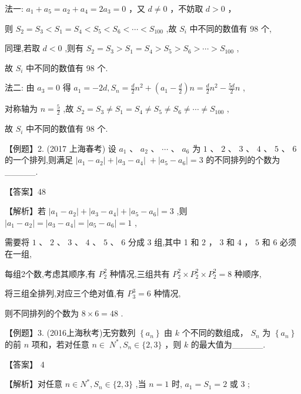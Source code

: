 \documentclass[10pt]{article}
\begin{document}
法一: \({a}_{1} + {a}_{5} = {a}_{2} + {a}_{4} = 2{a}_{3} = 0\) ，又 \(d \neq  0\) ，不妨取 \(d > 0\) ，

则 \({S}_{2} = {S}_{3} < {S}_{1} = {S}_{4} < {S}_{5} < {S}_{6} < \cdots  < {S}_{100}\) ,故 \({S}_{i}\) 中不同的数值有 98 个,

同理,若取 \(d < 0\) ,则有 \({S}_{2} = {S}_{3} > {S}_{1} = {S}_{4} > {S}_{5} > {S}_{6} > \cdots  > {S}_{100}\) ,

故 \({S}_{i}\) 中不同的数值有 98 个.

法二: 由 \({a}_{3} = 0\) 得 \({a}_{1} =  - {2d},{S}_{n} = \frac{d}{2}{n}^{2} + \left( {{a}_{1} - \frac{d}{2}}\right) n = \frac{d}{2}{n}^{2} - \frac{5d}{2}n\) ,

对称轴为 \(n = \frac{5}{2}\) ,故 \({S}_{2} = {S}_{3} \neq  {S}_{1} = {S}_{4} \neq  {S}_{5} \neq  {S}_{6} \neq  \cdots  \neq  {S}_{100}\) ,

故 \({S}_{i}\) 中不同的数值有 98 个.

【例题】2. (2017 上海春考) 设 \({a}_{1}\text{ 、 }{a}_{2}\text{ 、 }\cdots \text{ 、 }{a}_{6}\) 为 \(1\text{ 、 }2\text{ 、 }3\text{ 、 }4\text{ 、 }5\text{ 、 }6\) 的一个排列,则满足 \(\left| {{a}_{1} - {a}_{2}}\right|  + \left| {{a}_{3} - {a}_{4}}\right| \; + \left| {{a}_{5} - {a}_{6}}\right|  = 3\) 的不同排列的个数为\_\_\_\_\_.

【答案】48

【解析】若 \(\left| {{a}_{1} - {a}_{2}}\right|  + \left| {{a}_{3} - {a}_{4}}\right|  + \left| {{a}_{5} - {a}_{6}}\right|  = 3\) ,则 \(\left| {{a}_{1} - {a}_{2}}\right|  = \left| {{a}_{3} - {a}_{4}}\right|  = \left| {{a}_{5} - {a}_{6}}\right|  = 1\) ,

需要将 \(1\text{ 、 }2\text{ 、 }3\text{ 、 }4\text{ 、 }5\text{ 、 }6\) 分成 3 组,其中 1 和 \(2\text{ ， }3\) 和 \(4\text{ ， }5\) 和 6 必须在一组,

每组2个数,考虑其顺序,有 \({P}_{2}^{2}\) 种情况,三组共有 \({P}_{2}^{2} \times  {P}_{2}^{2} \times  {P}_{2}^{2} = 8\) 种顺序,

将三组全排列,对应三个绝对值,有 \({P}_{3}^{3} = 6\) 种情况,

则不同排列的个数为 \(8 \times  6 = {48}\) .

【例题】3. (2016上海秋考)无穷数列 \(\left\{  {a}_{n}\right\}\) 由 \(k\) 个不同的数组成， \({S}_{n}\) 为 \(\left\{  {a}_{n}\right\}\) 的前 \(n\) 项和，若对任意 \(n \in \; {N}^{ * },{S}_{n} \in  \{ 2,3\}\) ，则 \(k\) 的最大值为\_\_\_\_\_.

【答案】 4

【解析】对任意 \(n \in  {N}^{ * },{S}_{n} \in  \{ 2,3\}\) ,当 \(n = 1\) 时, \({a}_{1} = {S}_{1} = 2\) 或 3 ;
\end{document}
